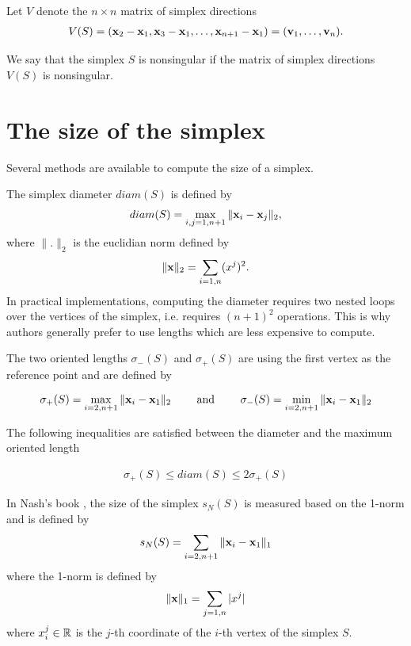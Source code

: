 Let $V$ denote the $n\times n$ matrix of simplex directions 
\begin{eqnarray}
\label{simplex-directions}
V(S) = (\mathbf{x}_2 - \mathbf{x}_1, \mathbf{x}_3 - \mathbf{x}_1 , \ldots , \mathbf{x}_{n+1} - \mathbf{x}_1) = (\mathbf{v}_1, \ldots , \mathbf{v}_n).
\end{eqnarray}

We say that the simplex $S$ is nonsingular if the matrix of simplex directions $V(S)$ is nonsingular.

\section{The size of the simplex}
\label{section-simplexsize}

Several methods are available to compute the size of a simplex.

The simplex diameter $diam(S)$ is defined by 
\begin{eqnarray}
\label{simplex-diameter}
diam(S) = \max_{i,j=1,n+1} \|\mathbf{x}_i - \mathbf{x}_j\|_2,
\end{eqnarray}
where $\|.\|_2$ is the euclidian norm defined by 
\begin{eqnarray}
\|\mathbf{x}\|_2 = \sum_{i=1,n}(x^j)^2.
\end{eqnarray}
In practical implementations, computing the diameter requires two nested loops over the 
vertices of the simplex, i.e. requires $(n+1)^2$ operations. This is why authors generally 
prefer to use lengths which are less expensive to compute.

The two oriented lengths $\sigma_-(S)$ and $\sigma_+(S)$ are using the 
first vertex as the reference point and are defined by 

\begin{eqnarray}
\label{simplex-sigma}
\sigma_+(S) = \max_{i=2,n+1} \|\mathbf{x}_i - \mathbf{x}_1\|_2 \qquad \textrm { and } \qquad \sigma_-(S) = \min_{i=2,n+1} \|\mathbf{x}_i - \mathbf{x}_1\|_2
\end{eqnarray}

The following inequalities are satisfied between the diameter and the maximum oriented length

\begin{eqnarray}
\label{simplex-sigma-diam}
\sigma_+(S) \leq diam(S) \leq 2 \sigma_+(S)
\end{eqnarray}

In Nash's book \cite{nla.cat-vn1060620}, the size of the simplex $s_N(S)$ is measured
based on the 1-norm and is defined by 
\begin{eqnarray}
\label{simplex-sizenash}
s_N(S) = \sum_{i=2,n+1} \|\mathbf{x}_i - \mathbf{x}_1\|_1
\end{eqnarray}
where the 1-norm is defined by 
\begin{eqnarray}
\label{simplex-sizenash2}
\|\mathbf{x} \|_1 = \sum_{j=1,n} |x^j|
\end{eqnarray}
where $x_i^j\in\mathbb{R}$ is the $j$-th coordinate of the $i$-th vertex of the simplex $S$.

